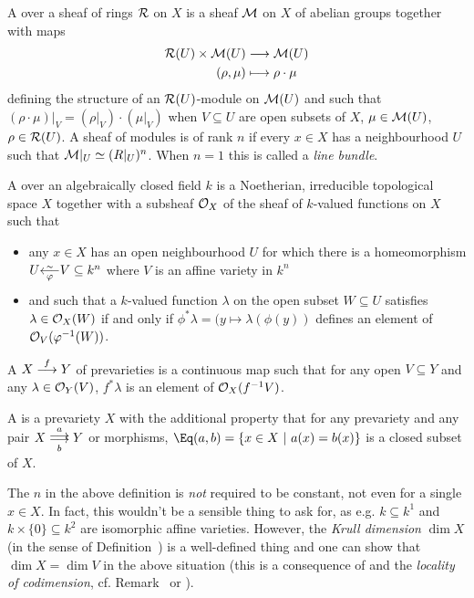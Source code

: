 \documentclass[a4paper,parskip=half,numbers=enddot, DIV=12]{scrreprt}
\begin{document}
\begin{defi}
    A  over a sheaf of rings $\mathcal{R}$ on $X$ is a sheaf $\mathcal{M}$ on $X$ of abelian groups together with maps 
    \begin{align*}
        \Rr(U) \times \Mm(U) &\morphism \Mm(U)\\
        (\rho,\mu) &\longmapsto \rho\cdot\mu
    \end{align*}
    defining the structure of an $\mathcal{R}(U)$-module on $\mathcal{M}(U)$ and such that $(\rho\cdot \mu)|_V = (\rho|_V)\cdot (\mu|_V)$ when $V\subseteq U$ are open subsets of $X$, $\mu\in \mathcal{M}(U)$, $\rho \in \mathcal{R}(U)$. A sheaf of modules is  of rank $n$ if every $x\in X$ has a neighbourhood $U$ such that $\mathcal{M}|_U\simeq(R|_U)^n$. When $n=1$ this is called a \emph{line bundle}.
\end{defi}
\begin{defi}[Prevariety]
    A  over an algebraically closed field $k$ is a Noetherian, irreducible topological space $X$ together with a subsheaf $\mathcal{O}_X$ of the sheaf of $k$-valued functions on $X$ such that 
    \begin{itemize}
    	\item any $x\in X$ has an open neighbourhood $U$ for which there is a homeomorphism $U\smash{\lisomorphism[\phi] }V\subseteq k^n$ where $V$ is an affine variety in $k^n$
    	\item and such that a $k$-valued function $\lambda$ on the open subset $W\subseteq U$ satisfies $\lambda \in \mathcal{O}_X(W)$ if and only if $\phi^*\lambda = (y\mapsto \lambda(\phi(y))$ defines an element of $\mathcal{O}_V(\varphi^{-1}(W))$. 
    \end{itemize}
    
    A  $X\morphism[f] Y$ of prevarieties is a continuous map such that for any open $V\subseteq Y$ and any $\lambda \in\mathcal{O}_Y(V)$, $f^*\lambda$ is an element of $\mathcal{O}_X(f^{-1}V)$.
    
    A  is a prevariety $X$ with the additional property that for any prevariety and any pair $X\doublemorphism[a][b] Y$ or morphisms, $\Eq(a,b) = \left\{x\in X\st a(x) = b(x)\right\}$ is a closed subset of $X$.
\end{defi}
\begin{rem}
The $n$ in the above definition is \emph{not} required to be constant, not even for a single $x\in X$. In fact, this wouldn't be a sensible thing to ask for, as e.g. $k\subseteq k^1$ and $k\times\{0\}\subseteq k^2$ are isomorphic affine varieties. However, the \emph{Krull dimension} $\dim X$ (in the sense of Definition~) is a well-defined thing and one can show that $\dim X=\dim V$ in the above situation (this is a consequence of \cite[Theorem~6]{alg1} and the \emph{locality of codimension}, cf. Remark~ or \cite[Remark~2.1.3]{alg1}).
\end{rem}
\end{document}

